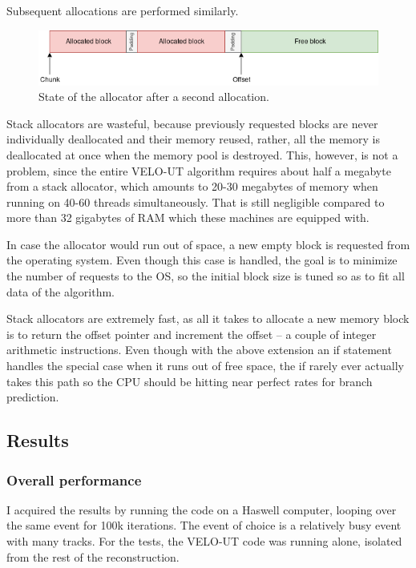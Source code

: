 \documentclass[12pt]{article}
\begin{document}
Subsequent allocations are performed similarly.

\begin{figure}[H]
	\begin{center}
		\includegraphics[width=\textwidth]{velout_stack_allocator_alloc2}
	\end{center}
	\caption{State of the allocator after a second allocation.}
	\label{fig_velout_stack_allocator_alloc2}
\end{figure}

Stack allocators are wasteful, because previously requested blocks are never individually deallocated and their memory reused, rather, all the memory is deallocated at once when the memory pool is destroyed. This, however, is not a problem, since the entire VELO-UT algorithm requires about half a megabyte from a stack allocator, which amounts to 20-30 megabytes of memory when running on 40-60 threads simultaneously. That is still negligible compared to more than 32 gigabytes of RAM which these machines are equipped with.

In case the allocator would run out of space, a new empty block is requested from the operating system. Even though this case is handled, the goal is to minimize the number of requests to the OS, so the initial block size is tuned so as to fit all data of the algorithm.

Stack allocators are extremely fast, as all it takes to allocate a new memory block is to return the offset pointer and increment the offset -- a couple of integer arithmetic instructions. Even though with the above extension an if statement handles the special case when it runs out of free space, the if rarely ever actually takes this path so the CPU should be hitting near perfect rates for branch prediction.


\subsection{Results}

\subsubsection{Overall performance}

I acquired the results by running the code on a Haswell computer, looping over the same event for 100k iterations. The event of choice is a relatively busy event with many tracks. For the tests, the VELO-UT code was running alone, isolated from the rest of the reconstruction.
\end{document}
